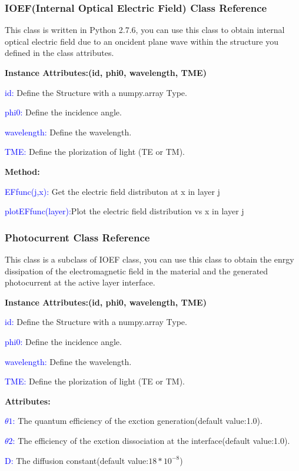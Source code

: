 \documentclass{article}
\begin{document}
\subsubsection{IOEF(Internal Optical Electric Field) Class Reference}
This class is written in Python 2.7.6, you can use this class to obtain internal
optical electric field due to an oncident plane wave
within the structure you defined in the class attributes.

\textbf{Instance Attributes:(id, phi0, wavelength, TME)}

\textcolor{blue}{id:} Define the Structure with a numpy.array Type.

\textcolor{blue}{phi0:} Define the incidence angle.

\textcolor{blue}{wavelength:} Define the wavelength.

\textcolor{blue}{TME:} Define the plorization of light (TE or TM).

\textbf{Method:}

\textcolor{blue}{EFfunc(j,x):} Get the electric field distributon at x in layer
j

\textcolor{blue}{plotEFfunc(layer):}Plot the electric field distribution vs x in
layer j
\subsubsection{Photocurrent Class Reference}
This class is a subclass of IOEF class, you can use this class to obtain the
enrgy dissipation of the electromagnetic field in the material and the
generated photocurrent at the active layer interface.

\textbf{Instance Attributes:(id, phi0, wavelength, TME)}

\textcolor{blue}{id:} Define the Structure with a numpy.array Type.

\textcolor{blue}{phi0:} Define the incidence angle.

\textcolor{blue}{wavelength:} Define the wavelength.

\textcolor{blue}{TME:} Define the plorization of light (TE or TM).

\textbf{Attributes:}

\textcolor{blue}{$\theta1$:} The quantum efficiency of the exction
generation(default value:1.0).

\textcolor{blue}{$\theta2$:} The efficiency of the exction dissociation at the
interface(default value:1.0).

\textcolor{blue}{D:} The diffusion constant(default
value:$18*10^{-8}$)
\end{document}
